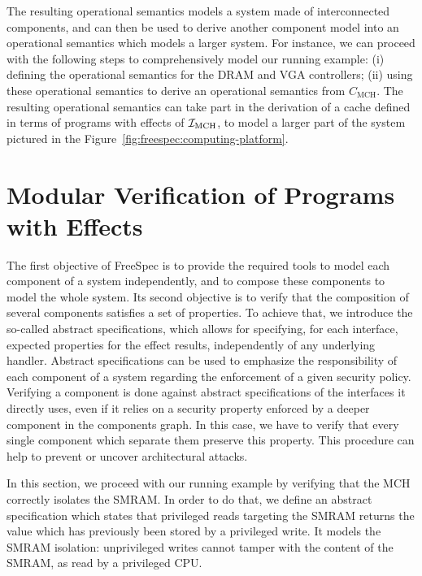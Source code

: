 %
The resulting operational semantics models a system made of interconnected
components, and can then be used to derive another component model into an
operational semantics which models a larger system.
%
For instance, we can proceed with the following steps to comprehensively model
our running example: (i) defining the operational semantics for the DRAM and VGA
controllers; (ii) using these operational semantics to derive an operational
semantics from $C_{\mathrm{MCH}}$.
%
The resulting operational semantics can take part in the derivation of a cache
defined in terms of programs with effects of $\mathcal{I}_{\mathrm{MCH}}$, to model a
larger part of the system pictured in the
Figure~\ref{fig:freespec:computing-platform}.

\section{Modular Verification of Programs with Effects}
\label{sec:freespec:verifying}

The first objective of FreeSpec is to provide the required tools to model each
component of a system independently, and to compose these components to model
the whole system.
%
Its second objective is to verify that the composition of several components
satisfies a set of properties.
%
To achieve that, we introduce the so-called abstract specifications, which
allows for specifying, for each interface, expected properties for the effect
results, independently of any underlying handler.
%
Abstract specifications can be used to emphasize the responsibility of each
component of a system regarding the enforcement of a given security policy.
%
Verifying a component is done against abstract specifications of the interfaces
it directly uses, even if it relies on a security property enforced by a deeper
component in the components graph.
%
In this case, we have to verify that every single component which separate them
preserve this property.
%
This procedure can help to prevent or uncover architectural attacks.

In this section, we proceed with our running example by verifying that the MCH
correctly isolates the SMRAM.
%
In order to do that, we define an abstract specification which states that
privileged reads targeting the SMRAM returns the value which has previously been
stored by a privileged write. It models the SMRAM isolation: unprivileged writes
cannot tamper with the content of the SMRAM, as read by a privileged CPU.


